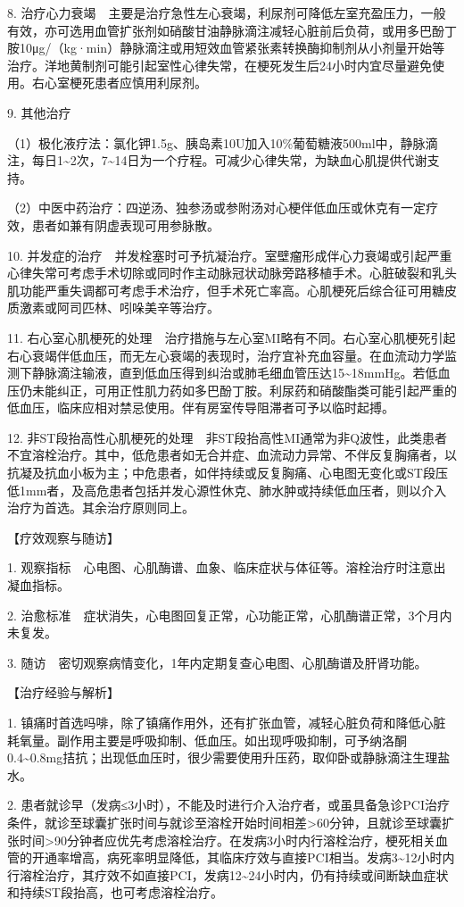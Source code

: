 8.
治疗心力衰竭　主要是治疗急性左心衰竭，利尿剂可降低左室充盈压力，一般有效，亦可选用血管扩张剂如硝酸甘油静脉滴注减轻心脏前后负荷，或用多巴酚丁胺10μg/（kg·min）静脉滴注或用短效血管紧张素转换酶抑制剂从小剂量开始等治疗。洋地黄制剂可能引起室性心律失常，在梗死发生后24小时内宜尽量避免使用。右心室梗死患者应慎用利尿剂。

9. 其他治疗

（1）极化液疗法：氯化钾1.5g、胰岛素10U加入10\%葡萄糖液500ml中，静脉滴注，每日1\textasciitilde{}2次，7\textasciitilde{}14日为一个疗程。可减少心律失常，为缺血心肌提供代谢支持。

（2）中医中药治疗：四逆汤、独参汤或参附汤对心梗伴低血压或休克有一定疗效，患者如兼有阴虚表现可用参脉散。

10.
并发症的治疗　并发栓塞时可予抗凝治疗。室壁瘤形成伴心力衰竭或引起严重心律失常可考虑手术切除或同时作主动脉冠状动脉旁路移植手术。心脏破裂和乳头肌功能严重失调都可考虑手术治疗，但手术死亡率高。心肌梗死后综合征可用糖皮质激素或阿司匹林、吲哚美辛等治疗。

11.
右心室心肌梗死的处理　治疗措施与左心室MI略有不同。右心室心肌梗死引起右心衰竭伴低血压，而无左心衰竭的表现时，治疗宜补充血容量。在血流动力学监测下静脉滴注输液，直到低血压得到纠治或肺毛细血管压达15\textasciitilde{}18mmHg。若低血压仍未能纠正，可用正性肌力药如多巴酚丁胺。利尿药和硝酸酯类可能引起严重的低血压，临床应相对禁忌使用。伴有房室传导阻滞者可予以临时起搏。

12.
非ST段抬高性心肌梗死的处理　非ST段抬高性MI通常为非Q波性，此类患者不宜溶栓治疗。其中，低危患者如无合并症、血流动力异常、不伴反复胸痛者，以抗凝及抗血小板为主；中危患者，如伴持续或反复胸痛、心电图无变化或ST段压低1mm者，及高危患者包括并发心源性休克、肺水肿或持续低血压者，则以介入治疗为首选。其余治疗原则同上。

【疗效观察与随访】

1.
观察指标　心电图、心肌酶谱、血象、临床症状与体征等。溶栓治疗时注意出凝血指标。

2.
治愈标准　症状消失，心电图回复正常，心功能正常，心肌酶谱正常，3个月内未复发。

3. 随访　密切观察病情变化，1年内定期复查心电图、心肌酶谱及肝肾功能。

【治疗经验与解析】

1.
镇痛时首选吗啡，除了镇痛作用外，还有扩张血管，减轻心脏负荷和降低心脏耗氧量。副作用主要是呼吸抑制、低血压。如出现呼吸抑制，可予纳洛酮0.4\textasciitilde{}0.8mg拮抗；出现低血压时，很少需要使用升压药，取仰卧或静脉滴注生理盐水。

2.
患者就诊早（发病≤3小时），不能及时进行介入治疗者，或虽具备急诊PCI治疗条件，就诊至球囊扩张时间与就诊至溶栓开始时间相差\textgreater{}60分钟，且就诊至球囊扩张时间\textgreater{}90分钟者应优先考虑溶栓治疗。在发病3小时内行溶栓治疗，梗死相关血管的开通率增高，病死率明显降低，其临床疗效与直接PCI相当。发病3\textasciitilde{}12小时内行溶栓治疗，其疗效不如直接PCI，发病12\textasciitilde{}24小时内，仍有持续或间断缺血症状和持续ST段抬高，也可考虑溶栓治疗。

